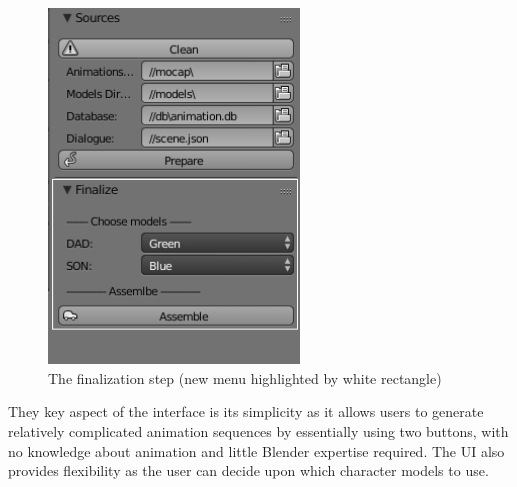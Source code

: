 \begin{figure}[!ht]
\centerline{\includegraphics[width = 18em]{img/ui_finalize.png}}
\caption{The finalization step (new menu highlighted by white rectangle)}\label{fig:ui_finalize}
\end{figure}

They key aspect of the interface is its simplicity as it allows users to generate relatively complicated animation sequences by essentially using two buttons, with no knowledge about animation and little Blender expertise required. The UI also provides flexibility as the user can decide upon which character models to use.





